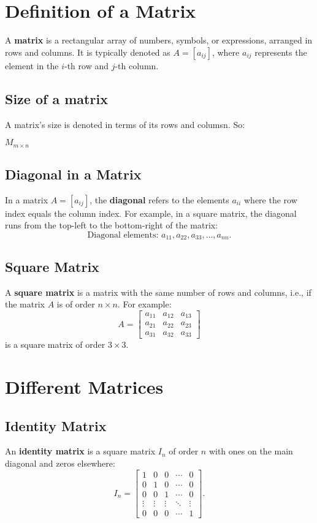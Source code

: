 \documentclass{article}
\begin{document}
\section{Definition of a Matrix}

A \textbf{matrix} is a rectangular array of numbers, symbols, or expressions, arranged in rows and columns. It is typically denoted as $A = [a_{ij}]$, where $a_{ij}$ represents the element in the $i$-th row and $j$-th column.

\subsection{Size of a matrix}

A matrix's size is denoted in terms of its rows and columsn. So:

$M_{m \times n}$ 


\subsection{Diagonal in a Matrix}
In a matrix $A = [a_{ij}]$, the \textbf{diagonal} refers to the elements $a_{ii}$ where the row index equals the column index. For example, in a square matrix, the diagonal runs from the top-left to the bottom-right of the matrix:
\[
\text{Diagonal elements: } a_{11}, a_{22}, a_{33}, \ldots, a_{nn}.
\]

\subsection{Square Matrix}
A \textbf{square matrix} is a matrix with the same number of rows and columns, i.e., if the matrix $A$ is of order $n \times n$. For example:
\[
A =
\begin{bmatrix}
a_{11} & a_{12} & a_{13} \\
a_{21} & a_{22} & a_{23} \\
a_{31} & a_{32} & a_{33}
\end{bmatrix}
\]
is a square matrix of order $3 \times 3$.

\section{Different Matrices}

\subsection{Identity Matrix}
An \textbf{identity matrix} is a square matrix $I_n$ of order $n$ with ones on the main diagonal and zeros elsewhere:
\[
I_n =
\begin{bmatrix}
1 & 0 & 0 & \cdots & 0 \\
0 & 1 & 0 & \cdots & 0 \\
0 & 0 & 1 & \cdots & 0 \\
\vdots & \vdots & \vdots & \ddots & \vdots \\
0 & 0 & 0 & \cdots & 1
\end{bmatrix}.
\]
\end{document}
